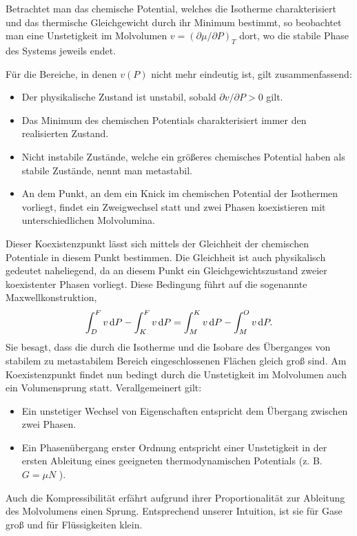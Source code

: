 \begin{summary}
    Betrachtet man das chemische Potential, welches die Isotherme charakterisiert und das thermische Gleichgewicht durch ihr Minimum bestimmt, so beobachtet man eine Unstetigkeit im Molvolumen $v=\left(\partial \mu/\partial P\right)_T$ dort, wo die stabile Phase des Systems jeweils endet.

    Für die Bereiche, in denen $v(P)$ nicht mehr eindeutig ist, gilt zusammenfassend:
    \begin{itemize}
        \item Der physikalische Zustand ist unstabil, sobald $\partial v/\partial P>0$ gilt.
        \item Das Minimum des chemischen Potentials charakterisiert immer den realisierten Zustand. 
        \item Nicht instabile Zustände, welche ein größeres chemisches Potential haben als stabile Zustände, nennt man metastabil.
        \item An dem Punkt, an dem ein Knick im chemischen Potential der Isothermen vorliegt, findet ein Zweigwechsel statt und zwei Phasen koexistieren mit unterschiedlichen Molvolumina.
    \end{itemize}
Dieser Koexistenzpunkt lässt sich mittels der Gleichheit der chemischen Potentiale in diesem Punkt bestimmen. Die Gleichheit ist auch physikalisch gedeutet naheliegend, da an diesem Punkt ein Gleichgewichtszustand zweier koexistenter Phasen vorliegt. Diese Bedingung führt auf die sogenannte Maxwellkonstruktion,
\begin{align*}
    \int_D^F v\mathop{}\!\mathrm{d} P-\int_K^F v\mathop{}\!\mathrm{d} P=\int_M^K v\mathop{}\!\mathrm{d} P-\int_M^O v\mathop{}\!\mathrm{d} P.
\end{align*}
Sie besagt, dass die durch die Isotherme und die Isobare des Überganges von stabilem zu metastabilem Bereich eingeschlossenen Flächen gleich groß sind.
Am Koexistenzpunkt findet nun bedingt durch die Unstetigkeit im Molvolumen auch ein Volumensprung statt.  
Verallgemeinert gilt:
\begin{itemize}
    \item Ein unstetiger Wechsel von Eigenschaften entspricht dem Übergang zwischen zwei Phasen.
    \item Ein Phasenübergang erster Ordnung entspricht einer Unstetigkeit in der ersten Ableitung eines
    geeigneten thermodynamischen Potentials (z. B. $G = \mu N$ ).
\end{itemize}
Auch die Kompressibilität erfährt aufgrund ihrer Proportionalität zur Ableitung des Molvolumens einen Sprung. Entsprechend unserer Intuition, ist sie für Gase groß und für Flüssigkeiten klein. 


\end{summary}
